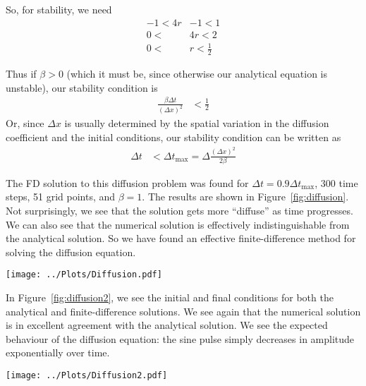 \documentclass[twocolumn]{myarticle}
\begin{document}
So, for stability, we need
\begin{align}
    -1 < 4r &- 1 < 1
    \\
    0 < &4r < 2
    \\
    0 < &r < \frac{1}{2}
\end{align}

Thus if $ \beta > 0 $ (which it must be, since otherwise our analytical equation is unstable), our stability condition is
\begin{align}
    \frac{\beta \Delta t}{(\Delta x)^2} &< \frac{1}{2}
\end{align}
Or, since $ \Delta x $ is usually determined by the spatial variation in the diffusion coefficient and the initial conditions, our stability condition can be written as
\begin{align}
    \Delta t &< \Delta t_\text{max} = \Delta\frac{(\Delta x)^2}{2 \beta}
\end{align}

The FD solution to this diffusion problem was found for $ \Delta t = 0.9 \Delta t_\text{max} $, 300 time steps, 51 grid points, and $ \beta = 1 $.
The results are shown in Figure~\ref{fig:diffusion}.
Not surprisingly, we see that the solution gets more ``diffuse'' as time progresses.
We can also see that the numerical solution is effectively indistinguishable from the analytical solution.
So we have found an effective finite-difference method for solving the diffusion equation.

\begin{figure*}[ht]
    \centering
    \texttt{[image: ../Plots/Diffusion.pdf]}
    \caption{Numerical and analytical solutions to the diffusion equation: full solution.}
    \label{fig:diffusion}
\end{figure*}

In Figure~\ref{fig:diffusion2}, we see the initial and final conditions for both the analytical and finite-difference solutions.
We see again that the numerical solution is in excellent agreement with the analytical solution.
We see the expected behaviour of the diffusion equation: the sine pulse simply decreases in amplitude exponentially over time.

\begin{figure*}[ht]
    \centering
    \texttt{[image: ../Plots/Diffusion2.pdf]}
    \caption{Numerical and analytical solutions to the diffusion equation: initial and final states.}
    \label{fig:diffusion2}
\end{figure*}
\end{document}
